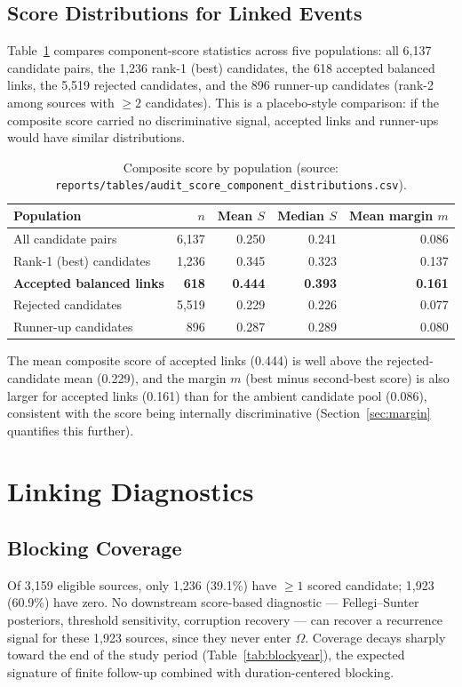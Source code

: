 \documentclass[11pt]{article}
\begin{document}
\subsection{Score Distributions for Linked Events}
Table~\ref{tab:scorepop} compares component-score statistics across five
populations: all 6{,}137 candidate pairs, the 1{,}236 rank-1 (best)
candidates, the 618 accepted balanced links, the 5{,}519 rejected
candidates, and the 896 runner-up candidates (rank-2 among sources with
$\geq 2$ candidates). This is a placebo-style comparison: if the composite
score carried no discriminative signal, accepted links and runner-ups would
have similar distributions.

\begin{table}[h!]
\centering
\caption{Composite score by population (source:
\texttt{reports/tables/}\newline\texttt{audit\_score\_component\_distributions.csv}).}
\label{tab:scorepop}
\small
\begin{tabular}{lrrrr}
\toprule
Population & $n$ & Mean $S$ & Median $S$ & Mean margin $m$ \\
\midrule
All candidate pairs & 6{,}137 & 0.250 & 0.241 & 0.086 \\
Rank-1 (best) candidates & 1{,}236 & 0.345 & 0.323 & 0.137 \\
\textbf{Accepted balanced links} & \textbf{618} & \textbf{0.444} & \textbf{0.393} & \textbf{0.161} \\
Rejected candidates & 5{,}519 & 0.229 & 0.226 & 0.077 \\
Runner-up candidates & 896 & 0.287 & 0.289 & 0.080 \\
\bottomrule
\end{tabular}
\end{table}
The mean composite score of accepted links (0.444) is well above the
rejected-candidate mean (0.229), and the margin $m$ (best minus second-best
score) is also larger for accepted links (0.161) than for the ambient
candidate pool (0.086), consistent with the score being internally
discriminative (Section~\ref{sec:margin} quantifies this further).

\section{Linking Diagnostics}
\label{sec:diagnostics}

\subsection{Blocking Coverage}
\label{sec:blocking}
Of 3{,}159 eligible sources, only 1{,}236 (39.1\%) have $\geq 1$ scored
candidate; 1{,}923 (60.9\%) have zero. No downstream score-based diagnostic
--- Fellegi--Sunter posteriors, threshold sensitivity, corruption recovery
--- can recover a recurrence signal for these 1{,}923 sources, since they
never enter $\Omega$. Coverage decays sharply toward the end of the study
period (Table~\ref{tab:blockyear}), the expected signature of finite
follow-up combined with duration-centered blocking.
\end{document}
